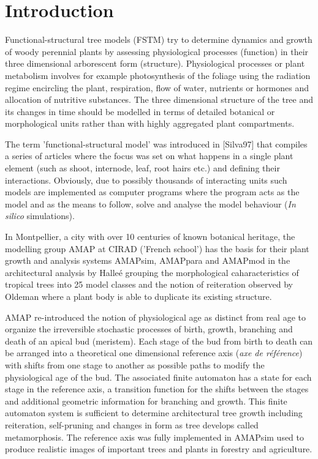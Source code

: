 \section{Introduction}

Functional-structural tree models (FSTM) try to determine dynamics and
growth of woody perennial  plants by assessing physiological processes
(function)  in their three  dimensional arborescent  form (structure).
Physiological  processes  or  plant  metabolism involves  for  example
photosynthesis of  the foliage  using the radiation  regime encircling
the  plant, respiration,  flow  of water,  nutrients  or hormones  and
allocation of  nutritive substances.  The  three dimensional structure
of the  tree and its  changes in time  should be modelled in  terms of
detailed  botanical or  morphological  units rather  than with  highly
aggregated plant compartments.

The  term 'functional-structural  model' was  introduced  in [Silva97]
that compiles  a series of  articles where the  focus was set  on what
happens in  a single  plant element (such  as shoot,  internode, leaf,
root hairs etc.)  and  defining their interactions.  Obviously, due to
possibly thousands of interacting units such models are implemented as
computer programs where the program acts as the model and as the means
to follow,  solve and analyse the  model behaviour (\textit{In silico}
simulations).

In  Montpellier, a  city with  over  10 centuries  of known  botanical
heritage, the modelling group AMAP  at CIRAD ('French school') has the
basis for  their plant growth  and analysis systems  AMAPsim, AMAPpara
and AMAPmod  in the architectural analysis by  Halle\'{e} grouping the
morphological caharacteristics of tropical trees into 25 model classes
and the notion  of reiteration observed by Oldeman  where a plant body
is able to duplicate its existing structure.

AMAP re-introduced  the notion of  physiological age as  distinct from
real age  to organize the irreversible stochastic  processes of birth,
growth, branching and death of an apical bud (meristem). Each stage of
the bud  from birth to  death can be  arranged into a  theoretical one
dimensional reference  axis (\textit {axe  de r\'{e}f\'{e}rence}) with
shifts  from one  stage to  another as  possible paths  to  modify the
physiological age of  the bud.  The associated finite  automaton has a
state for each stage in  the reference axis, a transition function for
the shifts between the stages and additional geometric information for
branching and  growth. This finite  automaton system is  sufficient to
determine    architectural   tree   growth    including   reiteration,
self-pruning   and   changes  in   form   as   tree  develops   called
metamorphosis.  The  reference axis  was fully implemented  in AMAPsim
used  to produce  realistic images  of important  trees and  plants in
forestry and agriculture.



